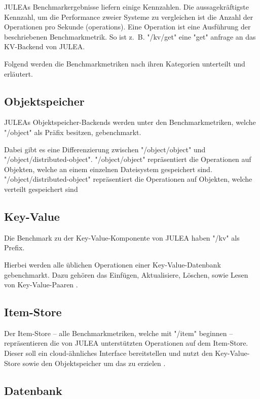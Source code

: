 JULEAs Benchmarkergebnisse liefern einige Kennzahlen. Die aussagekräftigste Kennzahl, um die Performance zweier Systeme zu vergleichen ist die Anzahl der Operationen pro Sekunde (operations). Eine Operation ist eine Ausführung der beschriebenen Benchmarkmetrik. So ist z. B. "/kv/get" eine "get" anfrage an das KV-Backend von JULEA. 

Folgend werden die Benchmarkmetriken nach ihren Kategorien unterteilt und erläutert.

\subsection{Objektspeicher}

JULEAs Objektspeicher-Backends werden unter den Benchmarkmetriken, welche "/object" als Präfix besitzen, gebenchmarkt.

Dabei gibt es eine Differenzierung zwischen "/object/object" und "/object/distributed-object". "/object/object" repräsentiert die Operationen auf Objekten, welche an einem einzelnen Dateisystem gespeichert sind. "/object/distributed-object" repräsentiert die Operationen auf Objekten, welche verteilt gespeichert sind \cite[Vgl. S. 718]{kuhnJULEAFlexibleStorage2017}

\subsection{Key-Value}

Die Benchmark zu der Key-Value-Komponente von JULEA haben "/kv" als Prefix. 

Hierbei werden alle üblichen Operationen einer Key-Value-Datenbank gebenchmarkt. Dazu gehören das Einfügen, Aktualisiere, Löschen, sowie Lesen von Key-Value-Paaren \cite[Vgl. S. 718]{kuhnJULEAFlexibleStorage2017}.

\subsection{Item-Store}

Der Item-Store – alle Benchmarkmetriken, welche mit "/item" beginnen – repräsentieren die von JULEA unterstützten Operationen auf dem Item-Store. Dieser soll ein cloud-ähnliches Interface bereitstellen und nutzt den Key-Value-Store sowie den Objektspeicher um das zu erzielen \cite[Vgl. 718]{kuhnJULEAFlexibleStorage2017}.

\subsection{Datenbank}


